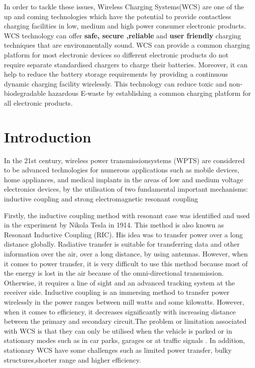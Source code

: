 \documentclass[12pt]{article}
\begin{document}
In order to tackle these issues, Wireless Charging Systems(WCS) are one of the up and coming technologies which have the potential to provide contactless charging facilities in low, medium and high power consumer electronic products. WCS technology can offer \textbf{safe, secure ,reliable} and \textbf{user friendly} charging techniques that are environmentally sound. WCS can provide a common charging platform for most electronic devices so different electronic products do not require separate standardised chargers to charge their batteries. Moreover, it can help to reduce the battery storage requirements by providing a continuous dynamic charging facility wirelessly. This technology can reduce toxic and non-biodegradable hazardous E-waste by establishing a common charging platform for all electronic products. %

\section{Introduction}
In the 21st century, wireless power transmissionsystems (WPTS) are considered to be advanced technologies for numerous applications
such as mobile devices, home appliances, and medical implants in the areas of low and medium voltage electronics devices, by the utilisation of two fundamental important mechanisms: inductive coupling and strong electromagnetic resonant coupling %

Firstly, the inductive coupling method with resonant case was identified and used in the experiment by Nikola Tesla in 1914.  This method is also known as Resonant Inductive Coupling (RIC). His idea was to transfer power over a long distance globally. Radiative transfer is suitable for transferring data and other information over the air, over a long distance, by using antennas. However, when it comes to power transfer, it is very difficult to use this method because most of the energy is lost in the air because of the omni-directional transmission. Otherwise, it requires a line of sight and an advanced tracking system at the receiver side. Inductive coupling is an immersing method to transfer power wirelessly in the power ranges between mill watts and some kilowatts.
However, when it comes to efficiency, it decreases significantly with increasing distance between the primary and secondary circuit.The problem or limitation associated with WCS is that they can only be utilised when the vehicle is parked or in stationary modes such as in car parks, garages or at traffic signals . In addition, stationary WCS have some challenges such as limited power transfer, bulky structures,shorter range and higher efficiency. 
\end{document}
